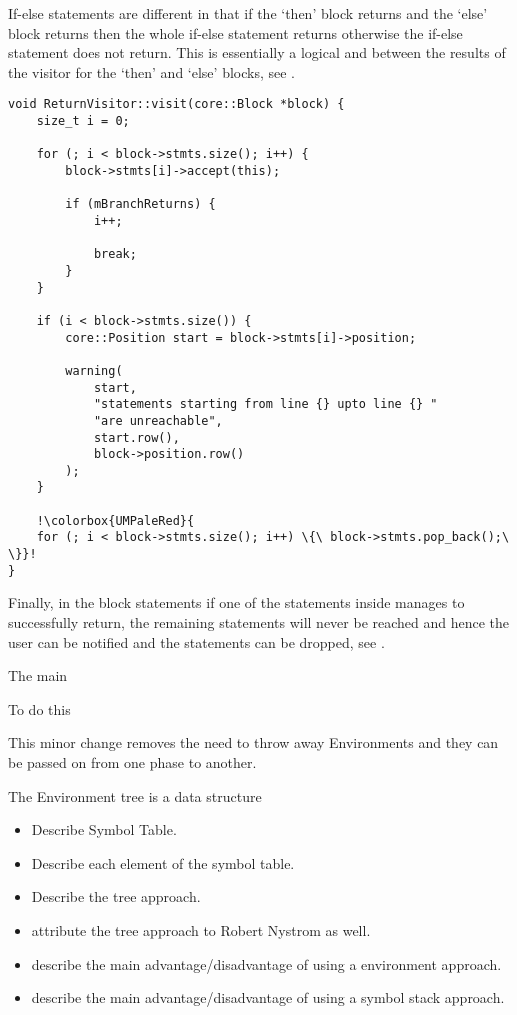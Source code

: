 If-else statements are different in that if the `then' block
returns and the `else' block returns then the whole if-else
statement returns otherwise the if-else statement does not
return. This is essentially a logical and between the results of
the visitor for the `then' and `else' blocks, see
.

\begin{lstlisting}[escapechar=!, caption={The \texttt{visit(Block *)} method
in the \texttt{ReturnVisitor} class
(analysis/ReturnVisitor.cpp)},label=lst:dropinblock]
void ReturnVisitor::visit(core::Block *block) {
    size_t i = 0;

    for (; i < block->stmts.size(); i++) {
        block->stmts[i]->accept(this);

        if (mBranchReturns) {
            i++;

            break;
        }
    }

    if (i < block->stmts.size()) {
        core::Position start = block->stmts[i]->position;

        warning(
            start,
            "statements starting from line {} upto line {} "
            "are unreachable",
            start.row(),
            block->position.row()
        );
    }

    !\colorbox{UMPaleRed}{
    for (; i < block->stmts.size(); i++) \{\ block->stmts.pop_back();\ \}}!
}
\end{lstlisting}

Finally, in the block statements if one of the statements inside
manages to successfully return, the remaining statements will
never be reached and hence the user can be notified and the
statements can be dropped, see .

The main


To do this

This minor change removes the need to throw away Environments
and they can be passed on from one phase to another.


The Environment tree is a data structure

\begin{itemize}
    \item Describe Symbol Table.
    \item Describe each element of the symbol table.
    \item Describe the tree approach.
    \item attribute the tree approach to Robert Nystrom as well.
    \item describe the main advantage/disadvantage of using a environment
        approach.
    \item describe the main advantage/disadvantage of using a symbol stack
        approach.
\end{itemize}
